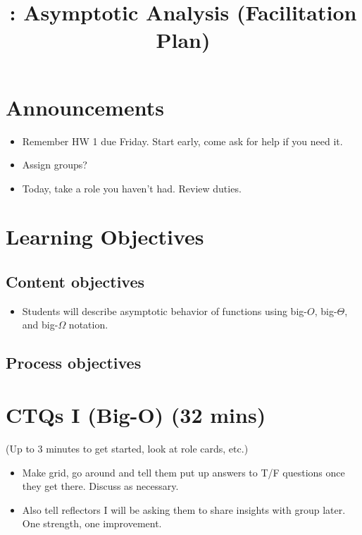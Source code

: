 \documentclass{tufte-handout}
\title{\thecourse: Asymptotic Analysis (Facilitation Plan)}
\date{}
\begin{document}
\maketitle

\section{Announcements}

\begin{itemize}
\item Remember HW 1 due Friday.  Start early, come ask for help if you
  need it.
\item Assign groups?

\item Today, take a role you haven't had.  Review duties.
\end{itemize}

\section{Learning Objectives}

\subsection{Content objectives}

\begin{itemize}
\item Students will describe asymptotic behavior of functions using
  big-$O$, big-$\Theta$, and big-$\Omega$ notation.
\end{itemize}

\subsection{Process objectives}

\section{CTQs I (Big-O) (32 mins)}

(Up to 3 minutes to get started, look at role cards, etc.)

\begin{itemize}
\item Make grid, go around and tell them put up answers to T/F
  questions once they get there.  Discuss as necessary.
\item Also tell reflectors I will be asking them to share insights
  with group later.  One strength, one improvement.
\end{itemize}
\end{document}
